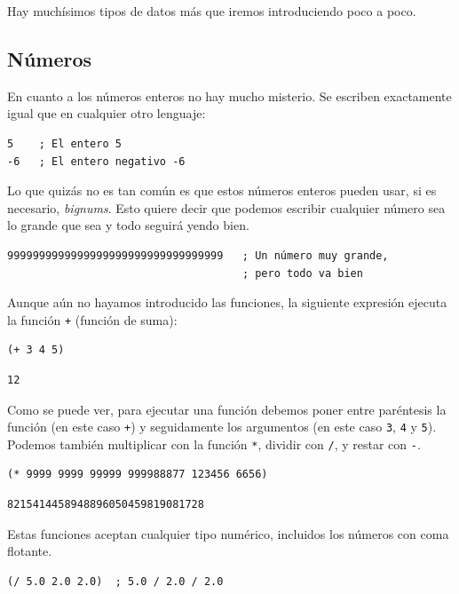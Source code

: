 \documentclass[11pt]{article}
\begin{document}
Hay muchísimos tipos de datos más que iremos introduciendo poco a poco.

\subsection{Números}
\label{sec:orgbc166e8}

En cuanto a los números enteros no hay mucho misterio. Se escriben exactamente igual que en cualquier otro lenguaje:

\begin{verbatim}
5    ; El entero 5
-6   ; El entero negativo -6
\end{verbatim}

Lo que quizás no es tan común es que estos números enteros pueden usar, si es necesario, \emph{bignums}. Esto quiere decir que podemos escribir cualquier número sea lo grande que sea y todo seguirá yendo bien. 

\begin{verbatim}
9999999999999999999999999999999999   ; Un número muy grande,
                                     ; pero todo va bien 
\end{verbatim}

Aunque aún no hayamos introducido las funciones, la siguiente expresión ejecuta la función \texttt{+} (función de suma):

\begin{verbatim}
(+ 3 4 5)
\end{verbatim}

\begin{verbatim}
12
\end{verbatim}


Como se puede ver, para ejecutar una función debemos poner entre paréntesis la función (en este caso \texttt{+}) y seguidamente los argumentos (en este caso \texttt{3}, \texttt{4} y \texttt{5}). Podemos también multiplicar con la función \texttt{*}, dividir con \texttt{/}, y restar con \texttt{-}.

\begin{verbatim}
(* 9999 9999 99999 999988877 123456 6656) 
\end{verbatim}

\begin{verbatim}
8215414458948896050459819081728
\end{verbatim}


Estas funciones aceptan cualquier tipo numérico, incluidos los números con coma flotante.

\begin{verbatim}
(/ 5.0 2.0 2.0)  ; 5.0 / 2.0 / 2.0
\end{verbatim}
\end{document}

